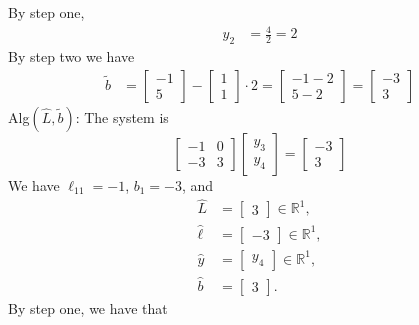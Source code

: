 \documentclass{report}
\begin{document}
    By step one, 
    \begin{align*}
        y_{2} &= \frac{4}{2} = 2
    \end{align*}
    By step two we have
    \begin{align*}
        \tilde{b} &= \begin{bmatrix} -1 \\ 5 \end{bmatrix} - \begin{bmatrix} 1 \\ 1 \end{bmatrix} \cdot 2 = \begin{bmatrix} -1 -2 \\ 5-2 \end{bmatrix} = \begin{bmatrix} -3 \\ 3 \end{bmatrix}
    \end{align*}
    Alg$(\hat{L}, \tilde{b})$: The system is
        \[
            \begin{bmatrix}
                -1 & 0 \\
                -3 & 3
            \end{bmatrix}
            \begin{bmatrix}
                y_{3} \\
                y_{4}
            \end{bmatrix}
            =
            \begin{bmatrix}
                -3 \\ 3
            \end{bmatrix}
        \]
    We have $\ell_{11} = -1$, $b_{1} = -3$, and 
    \begin{align*}
        \hat{L} &= \begin{bmatrix} 3 \end{bmatrix} \in \mathbb{R}^{1}, \\
        \hat{\ell} &= \begin{bmatrix} -3 \end{bmatrix} \in \mathbb{R}^{1}, \\
        \hat{y} &= \begin{bmatrix} y_{4} \end{bmatrix} \in \mathbb{R}^{1}, \\
        \hat{b} &= \begin{bmatrix} 3 \end{bmatrix}
    .\end{align*}
    By step one, we have that
\end{document}
